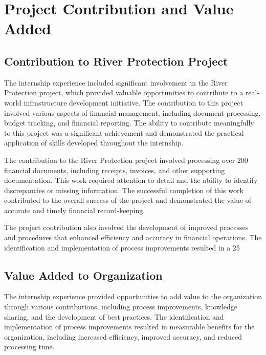 \section{Project Contribution and Value Added}

\subsection{Contribution to River Protection Project}
The internship experience included significant involvement in the River Protection project, which provided valuable opportunities to contribute to a real-world infrastructure development initiative. The contribution to this project involved various aspects of financial management, including document processing, budget tracking, and financial reporting. The ability to contribute meaningfully to this project was a significant achievement and demonstrated the practical application of skills developed throughout the internship.

The contribution to the River Protection project involved processing over 200 financial documents, including receipts, invoices, and other supporting documentation. This work required attention to detail and the ability to identify discrepancies or missing information. The successful completion of this work contributed to the overall success of the project and demonstrated the value of accurate and timely financial record-keeping.

The project contribution also involved the development of improved processes and procedures that enhanced efficiency and accuracy in financial operations. The identification and implementation of process improvements resulted in a 25%

\subsection{Value Added to Organization}
The internship experience provided opportunities to add value to the organization through various contributions, including process improvements, knowledge sharing, and the development of best practices. The identification and implementation of process improvements resulted in measurable benefits for the organization, including increased efficiency, improved accuracy, and reduced processing time.

